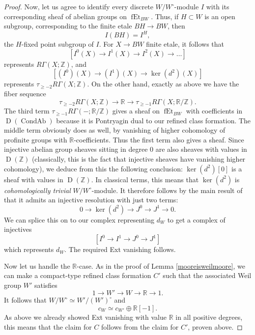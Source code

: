 \documentclass[12pt]{article}
\theoremstyle{definition}
\newcommand{\on}{\operatorname}
\newcommand{\mbb}{\mathbb}
\begin{document}
\begin{proof}
Now, let us agree to identify every discrete $W/W^\circ$-module $I$ with its corresponding sheaf of abelian groups on $\on{fEt}_{BW}$.  Thus, if $H\subset W$ is an open subgroup, corresponding to the finite etale $BH\to BW$, then
$$I(BH) = I^H,$$
the $H$-fixed point subgroup of $I$.
For $X\to BW$ finite etale, it follows that
$$[I^0(X) \to I^1(X) \to I^2(X) \to \ldots]$$
represents $R\Gamma(X;\mbb{Z})$, and
$$[(I^0)(X) \to (I^1)(X) \to \on{ker}(d^2)(X)]$$
represents $\tau_{\geq -2} R\Gamma(X;\mbb{Z})$.  On the other hand, exactly as above we have the fiber sequence
$$\tau_{\geq -2} R\Gamma(X;\mbb{Z}) \to \mbb{R} \to \tau_{\geq -1} R\Gamma(X;\mbb{R}/\mbb{Z}).$$
The third term $\tau_{\geq -1}R\Gamma(-;\mbb{R}/\mbb{Z})$ gives a sheaf on $\on{fEt}_{BW}$ with coefficients in $\on{D}(\on{CondAb})$ because it is Pontryagin dual to our refined class formation.  The middle term obviously does as well, by vanishing of higher cohomology of profinite groups with $\mbb{R}$-coefficients.  Thus the first term also gives a sheaf.  Since injective abelian group sheaves sitting in degree $0$ are also sheaves with values in $\on{D}(\mbb{Z})$ (classically, this is the fact that injective sheaves have vanishing higher cohomology), we deduce from this the following conclusion: $\on{ker}(d^2)[0]$ is a sheaf with values in $\on{D}(\mbb{Z})$.  In classical terms, this means that $\on{ker}(d^2)$ is \emph{cohomologically trivial} $W/W^\circ$-module.  It therefore follows by the main result of \cite{martinez} that it admits an injective resolution with just two terms:
$$0 \to \on{ker}(d^2) \to J^0 \to J^1 \to 0.$$
We can splice this on to our complex representing $d_W$ to get a complex of injectives
$$[I^0 \to I^1 \to J^0 \to J^1]$$
which represents $d_W$.  The required Ext vanishing follows.

Now let us handle the $\mbb{R}$-case.  As in the proof of Lemma \ref{mooreisweilmoore}, we can make a compact-type refined class formation $C'$ such that the associated Weil group $W'$ satisfies
$$1 \to W' \to W \to \mbb{R} \to 1.$$
It follows that $W/W^\circ \simeq W'/(W')^\circ$ and
$$c_W \simeq c_{W'}\oplus \mbb{R}[-1].$$
As above we already showed Ext vanishing with value $\mbb{R}$ in all positive degrees, this means that the claim for $C$ follows from the claim for $C'$, proven above.


\end{proof}
\end{document}
